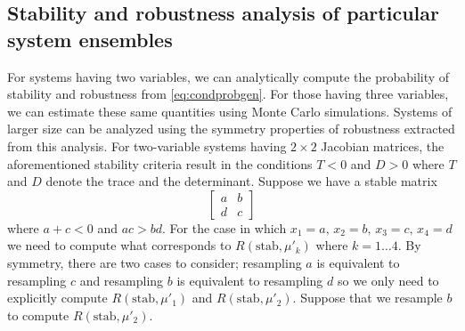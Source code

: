 \subsection{Stability and robustness analysis of particular system ensembles}
For systems having two variables, we can analytically compute the probability of stability and robustness from \ref{eq:condprobgen}. For those having three variables, we can estimate these same quantities using Monte Carlo simulations. Systems of larger size can be analyzed using the symmetry properties of robustness extracted from this analysis. For two-variable systems having $2 \times 2$ Jacobian matrices, the aforementioned stability criteria result in the conditions $T < 0$ and $D >
0$ where $T$ and $D$ denote the trace and the determinant. Suppose we have a stable matrix
$$
\begin{bmatrix}
a & b \\
d & c
\end{bmatrix}
$$
where $a + c < 0$ and $ac > bd$.  For the case in which $x_1=a,\,x_2=b,\,x_3=c,\,x_4=d$ we need to compute what corresponds to $R(\mathrm{stab},\mu'_k)$ where $k=1 \ldots 4$. By symmetry, there are two cases to consider; resampling $a$ is equivalent to resampling $c$ and resampling $b$ is equivalent to resampling $d$ so we only need to explicitly compute $ R(\mathrm{stab},\mu'_1)$ and $R(\mathrm{stab},\mu'_2)$. Suppose that we resample $b$ to compute $R(\mathrm{stab},\mu'_2)$.
